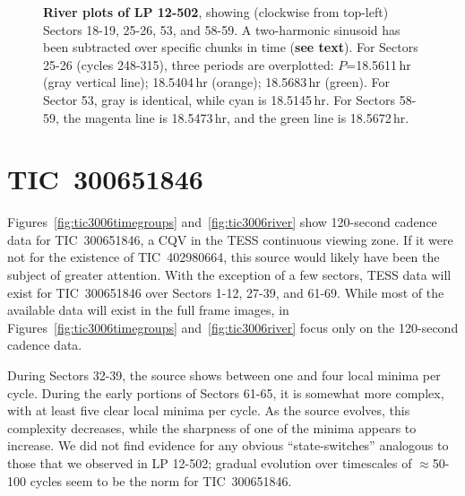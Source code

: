 \documentclass[11pt,twocolumn,tighten]{aastex63}
\begin{document}
\begin{figure*}[!t]
	\begin{center}
	\vspace{-1cm}
	\end{center}
	\vspace{-0.4cm}
	\caption{
    {\bf River plots of LP 12-502}, showing (clockwise from top-left)
    Sectors 18-19, 25-26, 53, and 58-59.  A two-harmonic sinusoid has
    been subtracted over specific chunks in time ({\bf see text}).
    For Sectors 25-26 (cycles 248-315), three periods are overplotted:
    $P$=18.5611\,hr (gray vertical line); 18.5404\,hr (orange); 18.5683\,hr (green).
    For Sector 53, gray is identical, while cyan is 18.5145\,hr.
    For Sectors 58-59, the magenta line is 18.5473\,hr, and the green
    line is 18.5672\,hr.
	}
	\label{fig:lpriver0}
\end{figure*}

\section{TIC~300651846}
\label{app:tic3006}

Figures~\ref{fig:tic3006timegroups} and~\ref{fig:tic3006river} show
120-second cadence data for TIC~300651846, a CQV in the TESS
continuous viewing zone.  If it were not for the existence of
TIC~402980664, this source would likely have been the subject of
greater attention.  With the exception of a few sectors, TESS data
will exist for TIC~300651846 over Sectors 1-12, 27-39, and 61-69.
While most of the available data will exist in the full frame images,
in Figures~\ref{fig:tic3006timegroups} and~\ref{fig:tic3006river}
focus only on the 120-second cadence data.

During Sectors 32-39, the source shows between one and four local
minima per cycle.  During the early portions of Sectors 61-65, it is
somewhat more complex, with at least five clear local minima per
cycle.  As the source evolves, this complexity decreases, while the
sharpness of one of the minima appears to increase.  We did not find
evidence for any obvious ``state-switches'' analogous to those that we
observed in LP 12-502; gradual evolution over timescales of
$\approx$50-100 cycles seem to be the norm for TIC~300651846.
\end{document}
